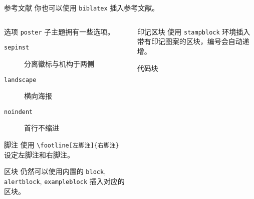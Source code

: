 \documentclass{ctexbeamer}
\begin{document}
\begin{frame}[fragile]
\begin{columns}[T]
\begin{column}{.45\textwidth}
\begin{stampblock}{参考文献}
          你也可以使用 \texttt{biblatex} 插入参考文献。

          \printbibliography
          
        \end{stampblock}
        
      \end{column}
    \end{columns}

    \vspace*{2cm}
    \vspace*{2cm}

    \begin{columns}
      \begin{column}{0.45\textwidth}
        \begin{block}{选项}
          \texttt{poster} 子主题拥有一些选项。
          \begin{description}
            \item[\texttt{sepinst}] 分离徽标与机构于两侧
            \item[\texttt{landscape}] 横向海报
            \item[\texttt{noindent}] 首行不缩进  
          \end{description}
        \end{block}
        \begin{alertblock}{脚注}
          使用 \texttt{\textbackslash{}footline[左脚注]\{右脚注\}} 设定左脚注和右脚注。
        \end{alertblock}
        \begin{exampleblock}{区块}
          仍然可以使用内置的 \texttt{block}, \texttt{alertblock}, \texttt{exampleblock} 插入对应的区块。
        \end{exampleblock}
      \end{column}
      \begin{column}{0.45\textwidth}
        
        \begin{stampblock}[a]{印记区块}
          使用 \texttt{stampblock} 环境插入带有印记图案的区块，编号会自动递增。
        \end{stampblock}
        
        \begin{codeblock}[escapechar=|]{代码块}
        \end{codeblock}


\end{column}
\end{columns}
\end{frame}
\end{document}
